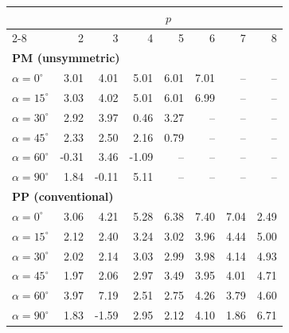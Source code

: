 \begin{tabular}{lrrrrrrr}
\toprule
& \multicolumn{7}{c}{$p$}\\
\cmidrule(lr){2-8}
 & 2 & 3 & 4 & 5 & 6 & 7 & 8\\
\midrule
\multicolumn{8}{l}{\textbf{PM (unsymmetric)}}\\
$\alpha=0^\circ$ & 3.01 & 4.01 & 5.01 & 6.01 & 7.01 & -- & --\\
$\alpha=15^\circ$ & 3.03 & 4.02 & 5.01 & 6.01 & 6.99 & -- & --\\
$\alpha=30^\circ$ & 2.92 & 3.97 & 0.46 & 3.27 & -- & -- & --\\
$\alpha=45^\circ$ & 2.33 & 2.50 & 2.16 & 0.79 & -- & -- & --\\
$\alpha=60^\circ$ & -0.31 & 3.46 & -1.09 & -- & -- & -- & --\\
$\alpha=90^\circ$ & 1.84 & -0.11 & 5.11 & -- & -- & -- & --\\
\midrule
\multicolumn{8}{l}{\textbf{PP (conventional)}}\\
$\alpha=0^\circ$ & 3.06 & 4.21 & 5.28 & 6.38 & 7.40 & 7.04 & 2.49\\
$\alpha=15^\circ$ & 2.12 & 2.40 & 3.24 & 3.02 & 3.96 & 4.44 & 5.00\\
$\alpha=30^\circ$ & 2.02 & 2.14 & 3.03 & 2.99 & 3.98 & 4.14 & 4.93\\
$\alpha=45^\circ$ & 1.97 & 2.06 & 2.97 & 3.49 & 3.95 & 4.01 & 4.71\\
$\alpha=60^\circ$ & 3.97 & 7.19 & 2.51 & 2.75 & 4.26 & 3.79 & 4.60\\
$\alpha=90^\circ$ & 1.83 & -1.59 & 2.95 & 2.12 & 4.10 & 1.86 & 6.71\\
\bottomrule
\end{tabular}

